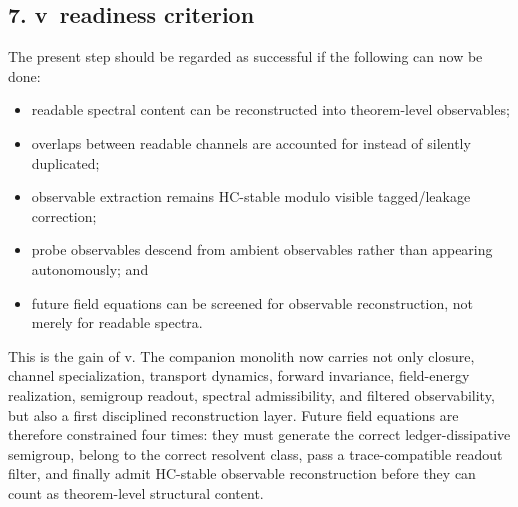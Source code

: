 \subsection*{7. v\docversion\ readiness criterion}
The present step should be regarded as successful if the following can now be done:
\begin{itemize}
  \item readable spectral content can be reconstructed into theorem-level observables;
  \item overlaps between readable channels are accounted for instead of silently duplicated;
  \item observable extraction remains HC-stable modulo visible tagged/leakage correction;
  \item probe observables descend from ambient observables rather than appearing autonomously; and
  \item future field equations can be screened for observable reconstruction, not merely for readable spectra.
\end{itemize}

This is the gain of v\docversion. The companion monolith now carries not only
closure, channel specialization, transport dynamics, forward invariance,
field-energy realization, semigroup readout, spectral admissibility, and filtered
observability, but also a first disciplined reconstruction layer. Future field
equations are therefore constrained four times: they must generate the correct
ledger-dissipative semigroup, belong to the correct resolvent class, pass a
trace-compatible readout filter, and finally admit HC-stable observable
reconstruction before they can count as theorem-level structural content.


